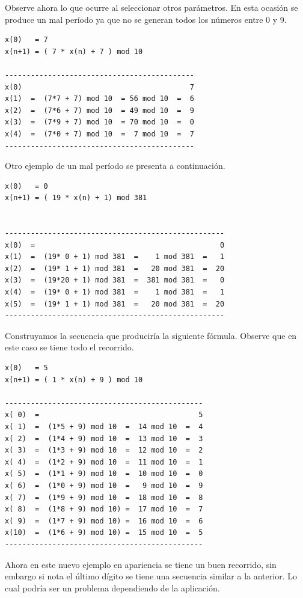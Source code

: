 Observe ahora lo que ocurre al seleccionar otros parámetros. En esta ocasión se produce un mal período ya que no se generan todos los números entre 0 y 9.
\begin{verbatim}
x(0)   = 7
x(n+1) = ( 7 * x(n) + 7 ) mod 10

--------------------------------------------
x(0)                                       7
x(1)  =  (7*7 + 7) mod 10  = 56 mod 10  =  6
x(2)  =  (7*6 + 7) mod 10  = 49 mod 10  =  9
x(3)  =  (7*9 + 7) mod 10  = 70 mod 10  =  0
x(4)  =  (7*0 + 7) mod 10  =  7 mod 10  =  7
--------------------------------------------
\end{verbatim}

Otro ejemplo de un mal período se presenta a continuación.

\begin{verbatim}
x(0)   = 0
x(n+1) = ( 19 * x(n) + 1) mod 381


---------------------------------------------------
x(0)  =                                           0
x(1)  =  (19* 0 + 1) mod 381  =    1 mod 381  =   1
x(2)  =  (19* 1 + 1) mod 381  =   20 mod 381  =  20
x(3)  =  (19*20 + 1) mod 381  =  381 mod 381  =   0
x(4)  =  (19* 0 + 1) mod 381  =    1 mod 381  =   1
x(5)  =  (19* 1 + 1) mod 381  =   20 mod 381  =  20
---------------------------------------------------
\end{verbatim}

Construyamos la secuencia que produciría la siguiente fórmula. Observe que en este caso se tiene todo el recorrido.

\begin{verbatim}
x(0)   = 5
x(n+1) = ( 1 * x(n) + 9 ) mod 10

----------------------------------------------
x( 0)  =                                     5
x( 1)  =  (1*5 + 9) mod 10  =  14 mod 10  =  4
x( 2)  =  (1*4 + 9) mod 10  =  13 mod 10  =  3
x( 3)  =  (1*3 + 9) mod 10  =  12 mod 10  =  2
x( 4)  =  (1*2 + 9) mod 10  =  11 mod 10  =  1
x( 5)  =  (1*1 + 9) mod 10  =  10 mod 10  =  0
x( 6)  =  (1*0 + 9) mod 10  =   9 mod 10  =  9
x( 7)  =  (1*9 + 9) mod 10  =  18 mod 10  =  8
x( 8)  =  (1*8 + 9) mod 10) =  17 mod 10  =  7
x( 9)  =  (1*7 + 9) mod 10) =  16 mod 10  =  6
x(10)  =  (1*6 + 9) mod 10) =  15 mod 10  =  5
----------------------------------------------
\end{verbatim}


Ahora en este nuevo ejemplo en apariencia se tiene un buen recorrido, sin embargo si nota el último dígito se tiene una secuencia similar a la anterior. Lo cual podría ser un problema dependiendo de la aplicación.


